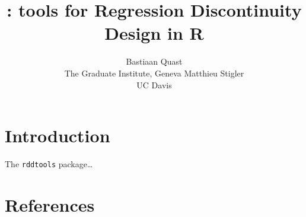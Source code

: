 \documentclass[article]{jss}
\author{
Bastiaan Quast\\The Graduate Institute, Geneva \And Matthieu Stigler\\UC Davis
}
\title{\pkg{rddtools}: tools for Regression Discontinuity Design in R}
\begin{document}
\section{Introduction}\label{introduction}

The \texttt{rddtools} package\ldots{}

\section{References}\label{references}
\end{document}
